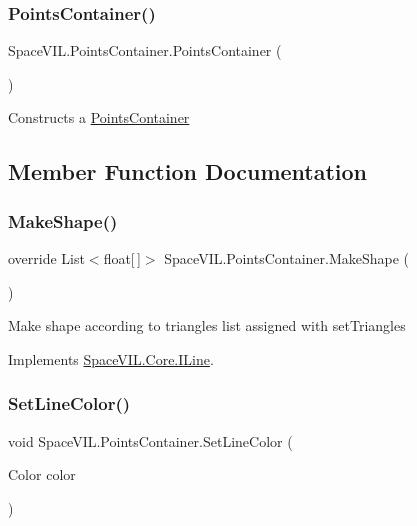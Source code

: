 \subsubsection{\texorpdfstring{Points\+Container()}{PointsContainer()}}
{\footnotesize\ttfamily Space\+V\+I\+L.\+Points\+Container.\+Points\+Container (\begin{DoxyParamCaption}{ }\end{DoxyParamCaption})}



Constructs a \mbox{\hyperlink{class_space_v_i_l_1_1_points_container}{Points\+Container}} 



\subsection{Member Function Documentation}
\mbox{\label{class_space_v_i_l_1_1_points_container_a7fd8cf39e463780c871d538b884a3fdb}} 
\subsubsection{\texorpdfstring{Make\+Shape()}{MakeShape()}}
{\footnotesize\ttfamily override List$<$float\mbox{[}$\,$\mbox{]}$>$ Space\+V\+I\+L.\+Points\+Container.\+Make\+Shape (\begin{DoxyParamCaption}{ }\end{DoxyParamCaption})}



Make shape according to triangles list assigned with set\+Triangles 



Implements \mbox{\hyperlink{interface_space_v_i_l_1_1_core_1_1_i_line}{Space\+V\+I\+L.\+Core.\+I\+Line}}.

\mbox{\label{class_space_v_i_l_1_1_points_container_a8e72d762905dd7f4a8d27863a36be99c}} 
\subsubsection{\texorpdfstring{Set\+Line\+Color()}{SetLineColor()}}
{\footnotesize\ttfamily void Space\+V\+I\+L.\+Points\+Container.\+Set\+Line\+Color (\begin{DoxyParamCaption}\item[{Color}]{color }\end{DoxyParamCaption})}



